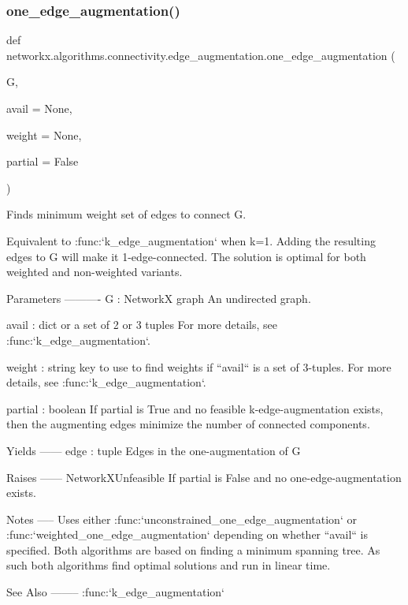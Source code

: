\subsubsection{\texorpdfstring{one\+\_\+edge\+\_\+augmentation()}{one\_edge\_augmentation()}}
{\footnotesize\ttfamily def networkx.\+algorithms.\+connectivity.\+edge\+\_\+augmentation.\+one\+\_\+edge\+\_\+augmentation (\begin{DoxyParamCaption}\item[{}]{G,  }\item[{}]{avail = {\ttfamily None},  }\item[{}]{weight = {\ttfamily None},  }\item[{}]{partial = {\ttfamily False} }\end{DoxyParamCaption})}

\begin{DoxyVerb}Finds minimum weight set of edges to connect G.

Equivalent to :func:`k_edge_augmentation` when k=1. Adding the resulting
edges to G will make it 1-edge-connected. The solution is optimal for both
weighted and non-weighted variants.

Parameters
----------
G : NetworkX graph
   An undirected graph.

avail : dict or a set of 2 or 3 tuples
    For more details, see :func:`k_edge_augmentation`.

weight : string
    key to use to find weights if ``avail`` is a set of 3-tuples.
    For more details, see :func:`k_edge_augmentation`.

partial : boolean
    If partial is True and no feasible k-edge-augmentation exists, then the
    augmenting edges minimize the number of connected components.

Yields
------
edge : tuple
    Edges in the one-augmentation of G

Raises
------
NetworkXUnfeasible
    If partial is False and no one-edge-augmentation exists.

Notes
-----
Uses either :func:`unconstrained_one_edge_augmentation` or
:func:`weighted_one_edge_augmentation` depending on whether ``avail`` is
specified. Both algorithms are based on finding a minimum spanning tree.
As such both algorithms find optimal solutions and run in linear time.

See Also
--------
:func:`k_edge_augmentation`
\end{DoxyVerb}
 \mbox{\label{namespacenetworkx_1_1algorithms_1_1connectivity_1_1edge__augmentation_a6deef4add1e5a47502471839bea102db}} 
